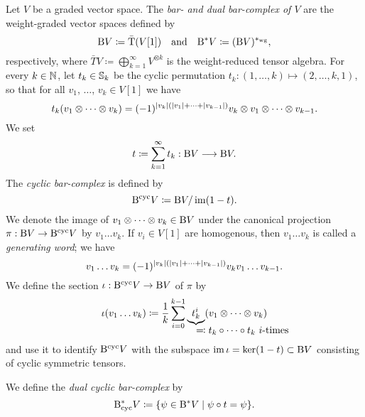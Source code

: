 \documentclass[\MainFolder/Text.tex]{subfiles}
\begin{document}
\begin{Definition} \label{Def:BarComplex}
Let $V$ be a graded vector space. The \emph{bar- and dual bar-complex of $V$} are the weight-graded vector spaces defined by 
$$ \mathrm{B} V\coloneqq \bar{\mathrm{T}}(V[1])\quad\text{and}\quad\mathrm{B}^* V \coloneqq (\mathrm{B} V)^{*_{\mathrm{wg}}}, $$
respectively, where $\bar{T}V \coloneqq \bigoplus_{k=1}^\infty V^{\otimes k}$ is the weight-reduced tensor algebra. For every $k\in \mathbb{N}$, let $t_k \in \mathbb{S}_k$ be the cyclic permutation $t_k : (1,\dotsc,k) \mapsto (2,\dotsc,k,1)$,
so that for all $v_1$, $\dotsc$, $v_k \in V[1]$ we have
\begin{equation*}
t_k(v_1 \otimes \dotsb \otimes v_k) = (-1)^{|v_k|(|v_1| + \dotsb + |v_{k-1}|)} v_k \otimes v_1 \otimes \dotsb \otimes v_{k-1}.
\end{equation*}
We set
$$ t\coloneqq \sum_{k=1}^\infty t_k : \mathrm{B} V \longrightarrow \mathrm{B} V. $$
The \emph{cyclic bar-complex} is defined by 
$$ \mathrm{B}^{\mathrm{cyc}} V \coloneqq \mathrm{B} V / \operatorname{im}(1-t). $$
We denote the image of $v_1 \otimes \dotsb \otimes v_k \in \mathrm{B} V$ under the canonical projection $\pi: \mathrm{B} V \rightarrow \mathrm{B}^{\mathrm{cyc}} V$ by $v_1\dots v_k$. If $v_i\in V[1]$ are homogenous, then $v_1\dots v_k$ is called a \emph{generating word}; we have
\begin{equation*}
v_1 \dots v_k = (-1)^{|v_k|(|v_1|+\dotsb + |v_{k-1}|)} v_k v_1 \dots v_{k-1}.
\end{equation*}
We define the section $\iota: \mathrm{B}^{\mathrm{cyc}} V \rightarrow \mathrm{B} V$ of $\pi$ by
$$ \iota(v_1\dots v_k) \coloneqq \frac{1}{k} \sum_{i=0}^{k-1} \underbrace{t_k^i}_{\mathrlap{\displaystyle \eqqcolon t_k \circ \dotsb \circ t_k\ i\text{-times}}}(v_1\otimes\dotsb \otimes v_k) $$
and use it to identify $\mathrm{B}^{\mathrm{cyc}} V$ with the subspace $\operatorname{im} \iota = \operatorname{ker}(1-t) \subset \mathrm{B} V$ consisting of cyclic symmetric tensors.

We define the \emph{dual cyclic bar-complex} by 
$$ \mathrm{B}_{\mathrm{cyc}}^* V \coloneqq \{ \psi\in \mathrm{B}^* V \mid \psi \circ t = \psi \}. $$
\end{Definition}
\end{document}
